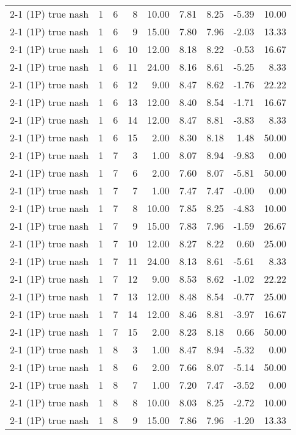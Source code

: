 \begin{tabular}{lrrrrrrrr}
2-1 (1P) true nash & 1 & 6 & 8 & 10.00 & 7.81 & 8.25 & -5.39 & 10.00 \\
2-1 (1P) true nash & 1 & 6 & 9 & 15.00 & 7.80 & 7.96 & -2.03 & 13.33 \\
2-1 (1P) true nash & 1 & 6 & 10 & 12.00 & 8.18 & 8.22 & -0.53 & 16.67 \\
2-1 (1P) true nash & 1 & 6 & 11 & 24.00 & 8.16 & 8.61 & -5.25 & 8.33 \\
2-1 (1P) true nash & 1 & 6 & 12 & 9.00 & 8.47 & 8.62 & -1.76 & 22.22 \\
2-1 (1P) true nash & 1 & 6 & 13 & 12.00 & 8.40 & 8.54 & -1.71 & 16.67 \\
2-1 (1P) true nash & 1 & 6 & 14 & 12.00 & 8.47 & 8.81 & -3.83 & 8.33 \\
2-1 (1P) true nash & 1 & 6 & 15 & 2.00 & 8.30 & 8.18 & 1.48 & 50.00 \\
2-1 (1P) true nash & 1 & 7 & 3 & 1.00 & 8.07 & 8.94 & -9.83 & 0.00 \\
2-1 (1P) true nash & 1 & 7 & 6 & 2.00 & 7.60 & 8.07 & -5.81 & 50.00 \\
2-1 (1P) true nash & 1 & 7 & 7 & 1.00 & 7.47 & 7.47 & -0.00 & 0.00 \\
2-1 (1P) true nash & 1 & 7 & 8 & 10.00 & 7.85 & 8.25 & -4.83 & 10.00 \\
2-1 (1P) true nash & 1 & 7 & 9 & 15.00 & 7.83 & 7.96 & -1.59 & 26.67 \\
2-1 (1P) true nash & 1 & 7 & 10 & 12.00 & 8.27 & 8.22 & 0.60 & 25.00 \\
2-1 (1P) true nash & 1 & 7 & 11 & 24.00 & 8.13 & 8.61 & -5.61 & 8.33 \\
2-1 (1P) true nash & 1 & 7 & 12 & 9.00 & 8.53 & 8.62 & -1.02 & 22.22 \\
2-1 (1P) true nash & 1 & 7 & 13 & 12.00 & 8.48 & 8.54 & -0.77 & 25.00 \\
2-1 (1P) true nash & 1 & 7 & 14 & 12.00 & 8.46 & 8.81 & -3.97 & 16.67 \\
2-1 (1P) true nash & 1 & 7 & 15 & 2.00 & 8.23 & 8.18 & 0.66 & 50.00 \\
2-1 (1P) true nash & 1 & 8 & 3 & 1.00 & 8.47 & 8.94 & -5.32 & 0.00 \\
2-1 (1P) true nash & 1 & 8 & 6 & 2.00 & 7.66 & 8.07 & -5.14 & 50.00 \\
2-1 (1P) true nash & 1 & 8 & 7 & 1.00 & 7.20 & 7.47 & -3.52 & 0.00 \\
2-1 (1P) true nash & 1 & 8 & 8 & 10.00 & 8.03 & 8.25 & -2.72 & 10.00 \\
2-1 (1P) true nash & 1 & 8 & 9 & 15.00 & 7.86 & 7.96 & -1.20 & 13.33 \\

\end{tabular}
